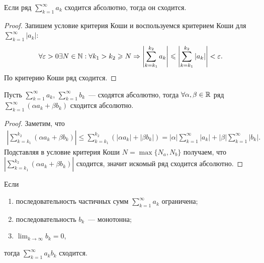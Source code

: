 \documentclass[../main.tex]{subfiles}
\begin{document}
\begin{proposition}
  Если ряд $ \sum_{k=1}^{\infty} a_k $ сходится абсолютно, тогда он сходится.
\end{proposition}

\begin{proof}
  Запишем условие критерия Коши и воспользуемся критерием Коши для $ \sum_{k=1}^{\infty} \left| a_k \right|  $: 
  \begin{gather} 
    \forall \varepsilon > 0 \exists N \in \mathbb{N}: \forall k_1 > k_2 \geqslant N \Rightarrow \left| \sum_{k=k_1 }^{k_2 }  a_k  \right| \leqslant \left| \sum_{k=k_1 }^{k_2 } \left| a_k \right|  \right| < \varepsilon.
  \end{gather} 
  По критерию Коши ряд сходится.
\end{proof}


\begin{proposition}
  Пусть $ \sum_{k=1}^{\infty} a_k $, $ \sum_{k=1}^{\infty} b_k $~--- сходятся абсолютно, тогда $\forall \alpha, \beta \in \mathbb{R}$ ряд $ \sum_{k=1}^{\infty} (\alpha a_k + \beta b_k ) $  сходится абсолютно. 
\end{proposition}


\begin{proof}
  Заметим, что 
  \begin{gather} 
    \left| \sum_{k=k_1 }^{k_2 } (\alpha a_k + \beta b_k )  \right| \leq \sum_{k=k_1 }^{k_2 } \left( \left| \alpha a_k  \right| + \left| \beta b_k  \right| \right) = \left| \alpha \right| \sum_{k=1}^{\infty} \left| a_k \right| + \left| \beta \right| \sum_{k=1}^{\infty} \left| b_k  \right| .  
  \end{gather}
  Подставляя в условие критерия Коши $N = \max \{ N_{a}, N_{b} \}$ получаем, что $ \left| \sum_{k=k_1 }^{k_2 } (\alpha a_k + \beta b_k )  \right| $  сходится, значит искомый ряд сходится абсолютно.
\end{proof}


\begin{proposition} \label{prop:ser:dirichlet}
  Если
  \begin{enumerate} 
    \item последовательность частичных сумм $ \sum_{k=1}^{\infty} a_k $ ограничена;
    \item последовательность $b_k$~--- монотонна;
    \item $\lim_{k \to \infty} b_k = 0$,
  \end{enumerate}
  тогда $ \sum_{k=1}^{\infty} a_k b_k  $ сходится. 
\end{proposition}
\end{document}

